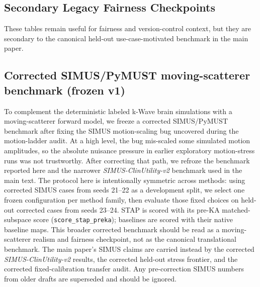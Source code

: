 
\subsection*{Secondary Legacy Fairness Checkpoints}
These tables remain useful for fairness and version-control context, but they are secondary to the canonical held-out use-case-motivated benchmark in the main paper.

\subsection{Corrected SIMUS/PyMUST moving-scatterer benchmark (frozen v1)}
\label{app:simus-frozen-benchmark}
To complement the deterministic labeled k-Wave brain simulations with a moving-scatterer forward model, we freeze a corrected SIMUS/PyMUST benchmark after fixing the SIMUS motion-scaling bug uncovered during the motion-ladder audit. At a high level, the bug mis-scaled some simulated motion amplitudes, so the absolute nuisance pressure in earlier exploratory motion-stress runs was not trustworthy. After correcting that path, we refroze the benchmark reported here and the narrower \emph{SIMUS-ClinUtility-v2} benchmark used in the main text. The protocol here is intentionally symmetric across methods: using corrected SIMUS cases from seeds 21--22 as a development split, we select one frozen configuration per method family, then evaluate those fixed choices on held-out corrected cases from seeds 23--24. STAP is scored with its pre-KA matched-subspace score (\texttt{score\_stap\_preka}); baselines are scored with their native baseline maps. This broader corrected benchmark should be read as a moving-scatterer realism and fairness checkpoint, not as the canonical translational benchmark. The main paper's SIMUS claims are carried instead by the corrected \emph{SIMUS-ClinUtility-v2} results, the corrected held-out stress frontier, and the corrected fixed-calibration transfer audit. Any pre-correction SIMUS numbers from older drafts are superseded and should be ignored.

